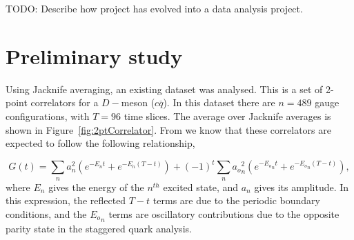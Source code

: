 \documentclass[a4paper,12pt]{article}
\begin{document}
\begin{table}
\centering
{}
\caption{Parameters of the data used in the main part of this project. Corresponding to sets 1, 5, 6 from table I\cite{chakraborty2021improved} respectively. TODO: update caption\label{table:latticeSpacing}}
\end{table}

TODO: Describe how project has evolved into a data analysis project.


\section{Preliminary study}

Using Jacknife averaging, an existing dataset\cite{data:prelim_meff} was analysed. This is a set of 2-point correlators for a $D-$meson ($c\overline{q}$). In this dataset there are $n=489$ gauge configurations, with $T=96$ time slices. The average over Jacknife averages is shown in Figure~\ref{fig:2ptCorrelator}. From\cite{2016Chakraborty} we know that these correlators are expected to follow the following relationship,

\begin{equation}
    \label{eq:2ptCorrelator}
    G(t) = \sum_n a_n^2 (e^{-E_n t} + e^{-E_n(T-t)}) + {(-1)}^t \sum_n {a_o}_n^2 (e^{-{E_o}_n t} + e^{{-E_o}_n (T-t)}),
\end{equation}
where $E_n$ gives the energy of the $n^{th}$ excited state, and $a_n$ gives its amplitude. In this expression, the reflected $T-t$ terms are due to the periodic boundary conditions, and the ${E_o}_n$ terms are oscillatory contributions due to the opposite parity state in the staggered quark analysis.
\end{document}
